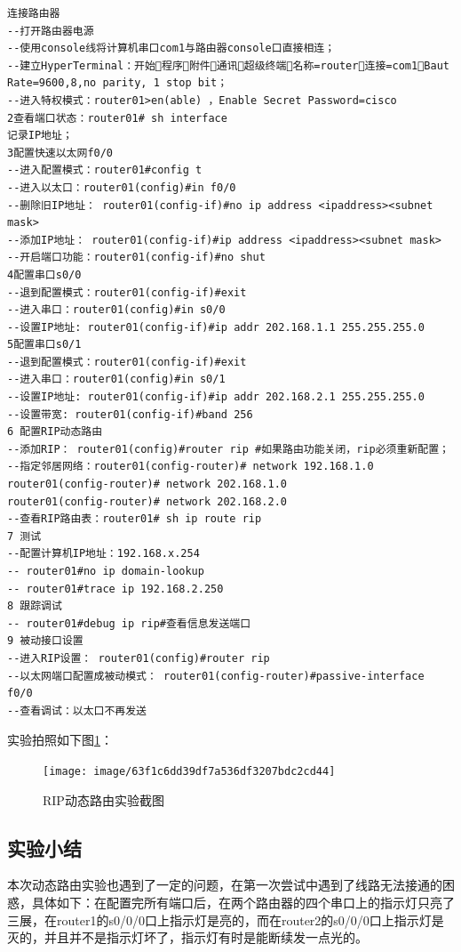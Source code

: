 \documentclass[lang=cn,11pt,a4paper,cite=authoryear]{elegantpaper}
\begin{document}
\begin{lstlisting}
连接路由器
--打开路由器电源
--使用console线将计算机串口com1与路由器console口直接相连；
--建立HyperTerminal：开始程序附件通讯超级终端名称=router连接=com1Baut Rate=9600,8,no parity, 1 stop bit；
--进入特权模式：router01>en(able) ，Enable Secret Password=cisco
2查看端口状态：router01# sh interface
记录IP地址；
3配置快速以太网f0/0
--进入配置模式：router01#config t
--进入以太口：router01(config)#in f0/0
--删除旧IP地址： router01(config-if)#no ip address <ipaddress><subnet mask>
--添加IP地址： router01(config-if)#ip address <ipaddress><subnet mask>
--开启端口功能：router01(config-if)#no shut
4配置串口s0/0
--退到配置模式：router01(config-if)#exit
--进入串口：router01(config)#in s0/0
--设置IP地址: router01(config-if)#ip addr 202.168.1.1 255.255.255.0
5配置串口s0/1
--退到配置模式：router01(config-if)#exit
--进入串口：router01(config)#in s0/1
--设置IP地址: router01(config-if)#ip addr 202.168.2.1 255.255.255.0
--设置带宽: router01(config-if)#band 256
6 配置RIP动态路由
--添加RIP： router01(config)#router rip #如果路由功能关闭，rip必须重新配置；
--指定邻居网络：router01(config-router)# network 192.168.1.0
router01(config-router)# network 202.168.1.0
router01(config-router)# network 202.168.2.0
--查看RIP路由表：router01# sh ip route rip 
7 测试
--配置计算机IP地址：192.168.x.254
-- router01#no ip domain-lookup
-- router01#trace ip 192.168.2.250
8 跟踪调试
-- router01#debug ip rip#查看信息发送端口
9 被动接口设置 
--进入RIP设置： router01(config)#router rip
--以太网端口配置成被动模式： router01(config-router)#passive-interface f0/0
--查看调试：以太口不再发送

\end{lstlisting}

实验拍照如下图\ref{fig:63f1c6dd39df7a536df3207bdc2cd44}：


\begin{figure}[htbp]
	\centering
	\texttt{[image: image/63f1c6dd39df7a536df3207bdc2cd44]}
	\caption{RIP动态路由实验截图}
	\label{fig:63f1c6dd39df7a536df3207bdc2cd44}
\end{figure}



\subsection{实验小结}

本次动态路由实验也遇到了一定的问题，在第一次尝试中遇到了线路无法接通的困惑，具体如下：在配置完所有端口后，在两个路由器的四个串口上的指示灯只亮了三展，在router1的s0/0/0口上指示灯是亮的，而在router2的s0/0/0口上指示灯是灭的，并且并不是指示灯坏了，指示灯有时是能断续发一点光的。
\end{document}
